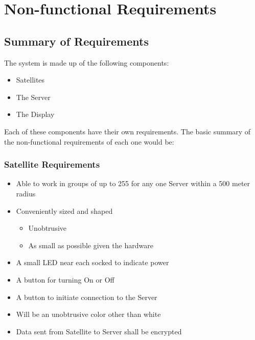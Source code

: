 \chapter{Non-functional Requirements}

\section{Summary of Requirements}


The system is made up of the following components:
\begin{itemize}
	 \item Satellites
	 \item The Server
	 \item The Display
\end{itemize}

Each of these components have their own requirements. The basic summary of the non-functional requirements of each one would be:

\subsection{Satellite Requirements}

\begin{itemize}
 	\item Able to work in groups of up to 255 for any one Server within a 500 meter radius
	\item Conveniently sized and shaped
	\begin{itemize}
		\item Unobtrusive
		\item As small as possible given the hardware
	\end{itemize}
	\item A small LED near each socked to indicate power
	\item A button for turning On or Off
	\item A button to initiate connection to the Server
	\item Will be an unobtrusive color other than white
	\item Data sent from Satellite to Server shall be encrypted
\end{itemize}

